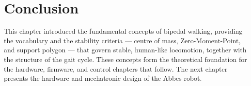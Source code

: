 \section{Conclusion}
This chapter introduced the fundamental concepts of bipedal walking,
providing the vocabulary and the stability criteria --- centre of mass,
Zero-Moment-Point, and support polygon --- that govern stable, human-like
locomotion, together with the structure of the gait cycle. These
concepts form the theoretical foundation for the hardware, firmware, and
control chapters that follow. The next chapter presents the hardware and
mechatronic design of the Abbes robot.
